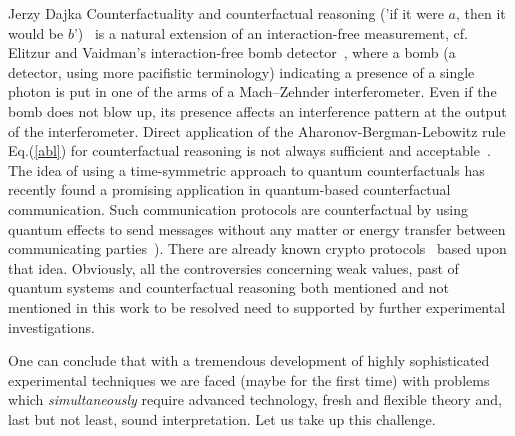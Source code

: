 \begin{artengenv}{Jerzy Dajka}
Counterfactuality and counterfactual reasoning ('if it were $a$, then it would be $b$')~\parencite{kont_book,kont0}  is a natural  extension of an interaction-free measurement, cf. Elitzur
and Vaidman’s interaction-free bomb detector~\parencite{bomb}, where a bomb (a detector, using more pacifistic terminology) indicating a presence of a single photon is put in
one of the arms of a Mach–Zehnder interferometer. Even if the
bomb does not blow up, its  presence  affects an interference pattern  at the output of the interferometer.  Direct application of the Aharonov-Bergman-Lebowitz rule Eq.(\ref{abl}) for counterfactual reasoning is not always sufficient and acceptable~\parencite{kont0}. The idea of using a time-symmetric approach to quantum counterfactuals has  recently  found a promising application in quantum-based counterfactual communication. Such communication protocols are counterfactual by using quantum effects to send
messages without any matter or energy transfer between communicating
parties~\parencite{kont1,kont2}). There are already known crypto protocols~\parencite{kont_crypto, kont_crypto0,kont_crypto1,kont_crypto1,kont_crypto2} based upon that idea.
Obviously, all the controversies concerning weak values, past of quantum systems and counterfactual reasoning both mentioned and not mentioned in this work to be resolved need to supported by further experimental investigations. 

One can conclude that with a tremendous development of highly sophisticated  experimental techniques we are faced (maybe for the first time) with problems which {\it simultaneously} require advanced technology, fresh and flexible theory and, last but not least, sound interpretation. Let us take up this challenge.    
 

\end{artengenv}